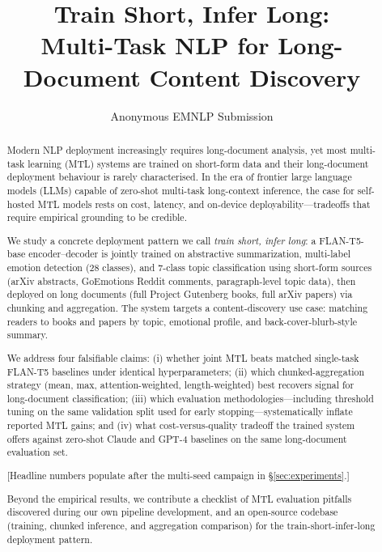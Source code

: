 \documentclass[11pt]{article}
\title{Train Short, Infer Long:\\Multi-Task NLP for Long-Document Content Discovery}
\author{Anonymous EMNLP Submission}
\begin{document}
\maketitle

\begin{abstract}
Modern NLP deployment increasingly requires long-document analysis, yet most multi-task learning (MTL) systems are trained on short-form data and their long-document deployment behaviour is rarely characterised. In the era of frontier large language models (LLMs) capable of zero-shot multi-task long-context inference, the case for self-hosted MTL models rests on cost, latency, and on-device deployability---tradeoffs that require empirical grounding to be credible.

We study a concrete deployment pattern we call \textit{train short, infer long}: a FLAN-T5-base encoder--decoder is jointly trained on abstractive summarization, multi-label emotion detection (28 classes), and 7-class topic classification using short-form sources (arXiv abstracts, GoEmotions Reddit comments, paragraph-level topic data), then deployed on long documents (full Project Gutenberg books, full arXiv papers) via chunking and aggregation. The system targets a content-discovery use case: matching readers to books and papers by topic, emotional profile, and back-cover-blurb-style summary.

We address four falsifiable claims: (i) whether joint MTL beats matched single-task FLAN-T5 baselines under identical hyperparameters; (ii) which chunked-aggregation strategy (mean, max, attention-weighted, length-weighted) best recovers signal for long-document classification; (iii) which evaluation methodologies---including threshold tuning on the same validation split used for early stopping---systematically inflate reported MTL gains; and (iv) what cost-versus-quality tradeoff the trained system offers against zero-shot Claude and GPT-4 baselines on the same long-document evaluation set.

[Headline numbers populate after the multi-seed campaign in \S\ref{sec:experiments}.]

Beyond the empirical results, we contribute a checklist of MTL evaluation pitfalls discovered during our own pipeline development, and an open-source codebase (training, chunked inference, and aggregation comparison) for the train-short-infer-long deployment pattern.
\end{abstract}

\end{document}
